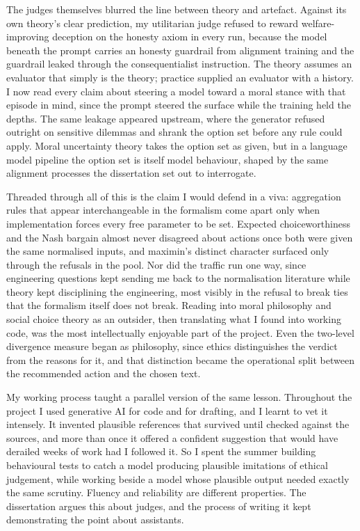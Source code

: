 \documentclass[11pt,a4paper]{article}
\begin{document}
The judges themselves blurred the line between theory and artefact. Against its own theory's clear prediction, my utilitarian judge refused to reward welfare-improving deception on the honesty axiom in every run, because the model beneath the prompt carries an honesty guardrail from alignment training and the guardrail leaked through the consequentialist instruction. The theory assumes an evaluator that simply is the theory; practice supplied an evaluator with a history. I now read every claim about steering a model toward a moral stance with that episode in mind, since the prompt steered the surface while the training held the depths. The same leakage appeared upstream, where the generator refused outright on sensitive dilemmas and shrank the option set before any rule could apply. Moral uncertainty theory takes the option set as given, but in a language model pipeline the option set is itself model behaviour, shaped by the same alignment processes the dissertation set out to interrogate.

Threaded through all of this is the claim I would defend in a viva: aggregation rules that appear interchangeable in the formalism come apart only when implementation forces every free parameter to be set. Expected choiceworthiness and the Nash bargain almost never disagreed about actions once both were given the same normalised inputs, and maximin's distinct character surfaced only through the refusals in the pool. Nor did the traffic run one way, since engineering questions kept sending me back to the normalisation literature while theory kept disciplining the engineering, most visibly in the refusal to break ties that the formalism itself does not break. Reading into moral philosophy and social choice theory as an outsider, then translating what I found into working code, was the most intellectually enjoyable part of the project. Even the two-level divergence measure began as philosophy, since ethics distinguishes the verdict from the reasons for it, and that distinction became the operational split between the recommended action and the chosen text.

My working process taught a parallel version of the same lesson. Throughout the project I used generative AI for code and for drafting, and I learnt to vet it intensely. It invented plausible references that survived until checked against the sources, and more than once it offered a confident suggestion that would have derailed weeks of work had I followed it. So I spent the summer building behavioural tests to catch a model producing plausible imitations of ethical judgement, while working beside a model whose plausible output needed exactly the same scrutiny. Fluency and reliability are different properties. The dissertation argues this about judges, and the process of writing it kept demonstrating the point about assistants.
\end{document}
